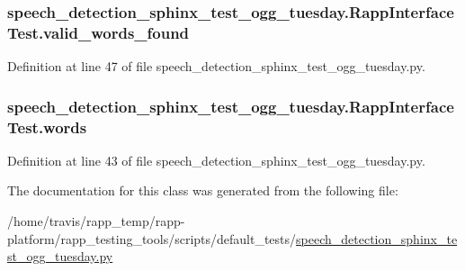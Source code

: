 \hypertarget{classspeech__detection__sphinx__test__ogg__tuesday_1_1RappInterfaceTest_a15fe3dc88f2c454ab1da9cf27c3dbe11}{
\subsubsection[{valid\-\_\-words\-\_\-found}]{\setlength{\rightskip}{0pt plus 5cm}speech\-\_\-detection\-\_\-sphinx\-\_\-test\-\_\-ogg\-\_\-tuesday.\-Rapp\-Interface\-Test.\-valid\-\_\-words\-\_\-found}}\label{classspeech__detection__sphinx__test__ogg__tuesday_1_1RappInterfaceTest_a15fe3dc88f2c454ab1da9cf27c3dbe11}


Definition at line 47 of file speech\-\_\-detection\-\_\-sphinx\-\_\-test\-\_\-ogg\-\_\-tuesday.\-py.

\hypertarget{classspeech__detection__sphinx__test__ogg__tuesday_1_1RappInterfaceTest_a8e01bca98cc833c09cde253268a315f0}{
\subsubsection[{words}]{\setlength{\rightskip}{0pt plus 5cm}speech\-\_\-detection\-\_\-sphinx\-\_\-test\-\_\-ogg\-\_\-tuesday.\-Rapp\-Interface\-Test.\-words}}\label{classspeech__detection__sphinx__test__ogg__tuesday_1_1RappInterfaceTest_a8e01bca98cc833c09cde253268a315f0}


Definition at line 43 of file speech\-\_\-detection\-\_\-sphinx\-\_\-test\-\_\-ogg\-\_\-tuesday.\-py.



The documentation for this class was generated from the following file\-:\begin{DoxyCompactItemize}
\item 
/home/travis/rapp\-\_\-temp/rapp-\/platform/rapp\-\_\-testing\-\_\-tools/scripts/default\-\_\-tests/\hyperlink{speech__detection__sphinx__test__ogg__tuesday_8py}{speech\-\_\-detection\-\_\-sphinx\-\_\-test\-\_\-ogg\-\_\-tuesday.\-py}\end{DoxyCompactItemize}

